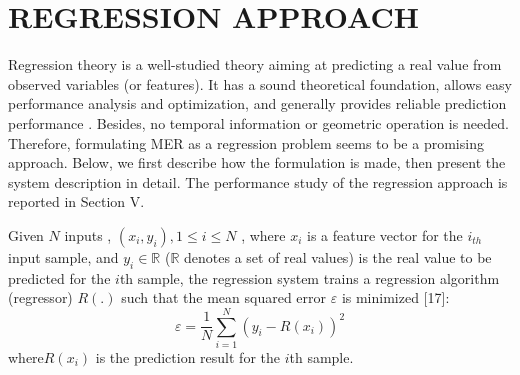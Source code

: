 \documentclass[journal, twoside]{IEEEtran}
\begin{document}
\section{REGRESSION APPROACH}
Regression theory is a well-studied theory aiming at predicting a real value from observed variables (or features). It
has a sound theoretical foundation, allows easy performance
analysis and optimization, and generally provides reliable
prediction performance \cite{17}. Besides, no temporal information
or geometric operation is needed. Therefore, formulating MER
as a regression problem seems to be a promising approach.
Below, we first describe how the formulation is made, then
present the system description in detail. The performance study
of the regression approach is reported in Section V.

    Given \( N \) inputs , \((x_i,y_i), 1\leq i\leq N\) , where \(x_i\) is a feature
vector for the \(i_{th}\) input sample, and \(y_i \in \mathbb{R}\) (\(\mathbb{R}\) denotes a set of real values) is the real value to be predicted for the \(i\)th sample,
the regression system trains a regression algorithm (regressor) \(R(.)\) such that the mean squared error \(\varepsilon\) is minimized [17]:
\begin{equation}
\varepsilon = \frac{1}{N} \sum_{i=1}^{N} (y_i - R(x_i))^2
\end{equation}
where\(R(x_i)\) is the prediction result for the \(i\)th sample.
\end{document}
